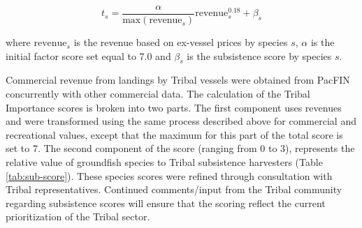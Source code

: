 \documentclass[11pt,
  english,
  a4paper,
]{article}
\begin{document}

\begin{equation}
t_{s} = \frac{\alpha}{\text{max}(\text{revenue}_{s})} \text{revenue}_{s}^{0.18} + \beta_s    
\end{equation}

\leavevmode\tagmcend\tagstructend\par


where {\(\text{revenue}_s\)\leavevmode\tagmcend\tagstructend} is the revenue based on ex-vessel prices by species {\(s\)\leavevmode\tagmcend\tagstructend}, {\(\alpha\)\leavevmode\tagmcend\tagstructend} is the initial factor score set equal to 7.0 and {\(\beta_s\)\leavevmode\tagmcend\tagstructend} is the subsistence score by species {\(s\)\leavevmode\tagmcend\tagstructend}.

\leavevmode\tagmcend\tagstructend\par


Commercial revenue from landings by Tribal vessels were obtained from PacFIN concurrently with other commercial data. The calculation of the Tribal Importance scores is broken into two parts. The first component uses revenues and were transformed using the same process described above for commercial and recreational values, except that the maximum for this part of the total score is set to 7. The second component of the score (ranging from 0 to 3), represents the relative value of groundfish species to Tribal subsistence harvesters (Table \ref{tab:sub-score}). These species scores were refined through consultation with Tribal representatives. Continued comments/input from the Tribal community regarding subsistence scores will ensure that the scoring reflect the current prioritization of the Tribal sector.

\leavevmode\tagmcend\tagstructend\par

\begingroup\fontsize{10}{12}\selectfont
\begingroup\fontsize{10}{12}\selectfont
\end{document}

